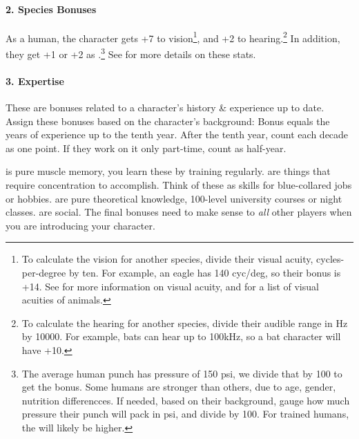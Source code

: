 
\paragraph*{2. Species Bonuses}
As a human, the character gets +7 to vision\footnote{
	To calculate the vision for another species, divide their visual acuity, cycles-per-degree by ten.
	For example, an eagle has 140 cyc/deg, so their bonus is +14.
	See \cite{caves_acuityview_2018} for more information on visual acuity,
	and \cite{noauthor_list_2019} for a list of visual acuities of animals.
},
and +2 to hearing.\footnote{
	To calculate the hearing for another species, divide their audible range in Hz by 10000.
	For example, bats can hear up to 100kHz, so a bat character will have +10.
}
In addition, they get +1 or +2 as .\footnote{
	The average human punch has pressure of 150 psi, we divide that by 100 to get the bonus.
	Some humans are stronger than others, due to age, gender, nutrition differencces.
	If needed, based on their background, gauge how much pressure their punch will pack in psi, and divide by 100.
	For trained humans, the  will likely be higher.
}
See  for more details on these stats.




\paragraph*{3. Expertise}

\begin{marginNote}
	
\end{marginNote}
These are bonuses related to a character's history \& experience up to date.
Assign these bonuses based on the character's background:
Bonus equals the years of experience up to the tenth year.
After the tenth year, count each decade as one point.
If they work on it only part-time, count as half-year.\par
{} is pure muscle memory, you learn these by training regularly.
 are things that require concentration to accomplish. Think of these as skills for blue-collared jobs or hobbies.
 are pure theoretical knowledge, 100-level university courses or night classes.
 are social.
The final bonuses need to make sense to \emph{all} other players when you are introducing your character.\par

